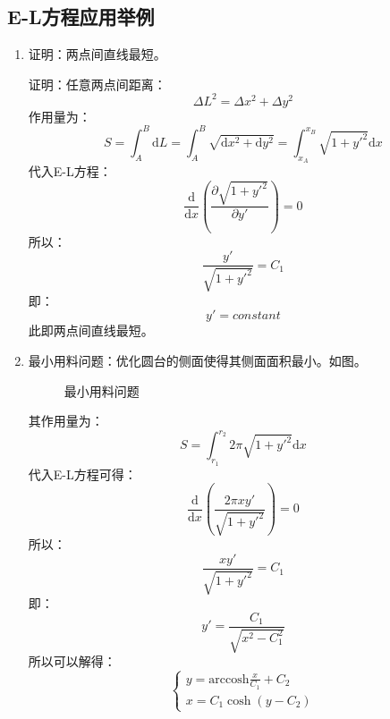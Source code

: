 \subsection{E-L方程应用举例}

\begin{enumerate}
	\item 
		证明：两点间直线最短。
		
		证明：任意两点间距离：
		\[\Delta L^2 = \Delta x^2 + \Delta y^2\]
		作用量为：
		\[S = \int_{A}^{B} \mathrm{d}L = \int_{A}^{B} \sqrt{\mathrm{d}x^2+\mathrm{d}y^2} = \int_{x_A}^{x_B} \sqrt{1 + y'^2} \mathrm{d}x\]
		代入E-L方程：
		\[\frac{\mathrm{d}}{\mathrm{d}x} \left( \frac{\partial \sqrt{1 + y'^2}}{\partial y'} \right) = 0\]
		所以：
		\[\frac{y'}{\sqrt{1 + y'^2}} = C_1 \]
		即：
		\[y' = constant\]
		此即两点间直线最短。\\
	\item
		最小用料问题：优化圆台的侧面使得其侧面面积最小。如图。
		\begin{figure}
			\centering
			\caption{最小用料问题}
		\end{figure}
		其作用量为：
		\[S = \int_{r_1}^{r_2} 2\pi \sqrt{1+y'^2}\mathrm{d}x\]
		代入E-L方程可得：
		\[\frac{\mathrm{d}}{\mathrm{d}x} \left( \frac{2\pi x y'}{\sqrt{1+y'^2}} \right) = 0\]
		所以：
		\[\frac{x y'}{\sqrt{1+y'^2}} = C_1\]
		即：
		\[y' = \frac{C_1}{\sqrt{x^2-C_1^2}}\]
		所以可以解得：
		\begin{equation}
		\left\{
		\begin{array}{c}
		y = \mathrm{arccosh} \frac{x}{C_1} + C_2\\
		x= C_1 \cosh (y-C_2) 
		\end{array}
		\right.
		\end{equation}
		

\end{enumerate}
